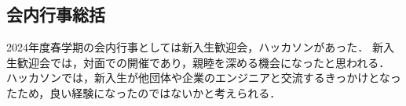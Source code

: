 \subsection*{会内行事総括}


2024年度春学期の会内行事としては新入生歓迎会，ハッカソンがあった．
新入生歓迎会では，対面での開催であり，親睦を深める機会になったと思われる．
ハッカソンでは，新入生が他団体や企業のエンジニアと交流するきっかけとなったため，良い経験になったのではないかと考えられる．
